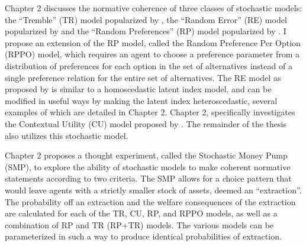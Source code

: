 \documentclass[../main.tex]{subfiles}
\begin{document}
Chapter 2 discusses the normative coherence of three classes of stochastic models: the \enquote{Tremble} (TR) model popularized by \textcite{Harless1994}, the \enquote{Random Error} (RE) model popularized by \textcite{Hey1994} and the \enquote{Random Preferences} (RP) model popularized by \textcite{Loomes1998}.
I propose an extension of the RP model, called the Random Preference Per Option (RPPO) model, which requires an agent to choose a preference parameter from a distribution of preferences for each option in the set of alternatives instead of a single preference relation for the entire set of alternatives.
The RE model as proposed by \textcite{Hey1994} is similar to a homoscedastic latent index model, and can be modified in useful ways by making the latent index heteroscedastic, several examples of which are detailed in Chapter 2.
Chapter 2, specifically investigates the Contextual Utility (CU) model proposed by \textcite{Wilcox2008}.
The remainder of the thesis also utilizes this stochastic model.


Chapter 2 proposes a thought experiment, called the Stochastic Money Pump (SMP), to explore the ability of stochastic models to make coherent normative statements according to two criteria.
The SMP allows for a choice pattern that would leave agents with a strictly smaller stock of assets, deemed an \enquote{extraction}.
The probability off an extraction and the welfare consequences of the extraction are calculated for each of the TR, CU, RP, and RPPO models, as well as a combination of RP and TR (RP+TR) models.
The various models can be parameterized in such a way to produce identical probabilities of extraction.
\end{document}
